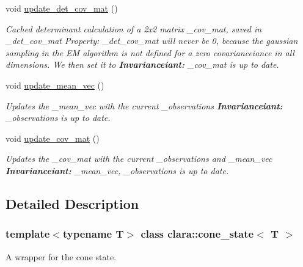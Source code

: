 \begin{DoxyCompactItemize}
\mbox{\label{classclara_1_1cone__state_ac04710abc3eba0e3688c70eaeab3f2ce}} 
void \hyperlink{classclara_1_1cone__state_ac04710abc3eba0e3688c70eaeab3f2ce}{update\+\_\+det\+\_\+cov\+\_\+mat} ()
\begin{DoxyCompactList}\small\item\em Cached determinant calculation of a 2x2 matrix {\ttfamily \+\_\+cov\+\_\+mat}, saved in {\ttfamily \+\_\+det\+\_\+cov\+\_\+mat} Property\+: {\ttfamily \+\_\+det\+\_\+cov\+\_\+mat} will never be 0, because the gaussian sampling in the EM algorithm is not defined for a zero covarianceiance in all dimensions. We then set it to {} {\bfseries Invarianceiant\+:} {\ttfamily \+\_\+cov\+\_\+mat} is up to date. \end{DoxyCompactList}\item 
void \hyperlink{classclara_1_1cone__state_ada683dbedcee79d84db8255ee5e71e6e}{update\+\_\+mean\+\_\+vec} ()
\begin{DoxyCompactList}\small\item\em Updates the {\ttfamily \+\_\+mean\+\_\+vec} with the current {\ttfamily \+\_\+observations} {\bfseries Invarianceiant\+:} {\ttfamily \+\_\+observations} is up to date. \end{DoxyCompactList}\item 
void \hyperlink{classclara_1_1cone__state_a946bca664d068d7a82e3740eb736e948}{update\+\_\+cov\+\_\+mat} ()
\begin{DoxyCompactList}\small\item\em Updates the {\ttfamily \+\_\+cov\+\_\+mat} with the current {\ttfamily \+\_\+observations} and {\ttfamily \+\_\+mean\+\_\+vec} {\bfseries Invarianceiant\+:} {\ttfamily \+\_\+mean\+\_\+vec}, {\ttfamily \+\_\+observations} is up to date. \end{DoxyCompactList}\end{DoxyCompactItemize}


\subsection{Detailed Description}
\subsubsection*{template$<$typename T$>$\newline
class clara\+::cone\+\_\+state$<$ T $>$}

A wrapper for the cone state. 

